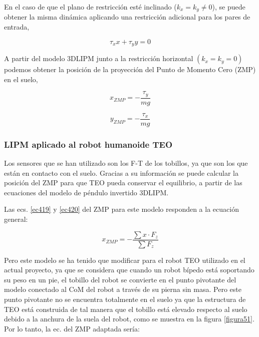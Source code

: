 En el caso de que el plano de restricción esté inclinado ($k_x=k_y\neq0$), se puede obtener la misma dinámica aplicando una restricción adicional para los pares de entrada,

\begin{equation}
\tau_{x} x + \tau_{y} y = 0
\label{ec418}
\end{equation}

A partir del modelo 3DLIPM junto a la restricción horizontal $(k_x=k_y=0)$ podemos obtener la posición de la proyección del Punto de Momento Cero (ZMP) en el suelo,

\begin{equation}
x_{ZMP} = -\frac{\tau_y}{mg}
\label{ec419}
\end{equation}

\begin{equation}
y_{ZMP} = -\frac{\tau_x}{mg}
\label{ec420}
\end{equation}




\subsubsection{LIPM aplicado al robot humanoide TEO}

Los sensores que se han utilizado son los F-T de los tobillos, ya que son los que están en contacto con el suelo. Gracias a su información se puede calcular la posición del ZMP para que TEO pueda conservar el equilibrio, a partir de las ecuaciones del modelo de péndulo invertido 3DLIPM. 

Las ecs. \ref{ec419} y \ref{ec420} del ZMP para este modelo responden a la ecuación general:

\begin{equation}
x_{ZMP}=-\frac{\sum x\cdot F_z}{\sum F_z}
\label{ec421}
\end{equation}

Pero este modelo se ha tenido que modificar para el robot TEO utilizado en el actual proyecto, ya que se considera que cuando un robot bípedo está soportando su peso en un pie, el tobillo del robot se convierte en el punto pivotante del modelo conectado al CoM del robot a través de su pierna sin masa. Pero este punto pivotante no se encuentra totalmente en el suelo ya que la estructura de TEO está construida de tal manera que el tobillo está elevado respecto al suelo debido a la anchura de la suela del robot, como se muestra en la figura \ref{figura51}. Por lo tanto, la ec. del ZMP adaptada sería:

